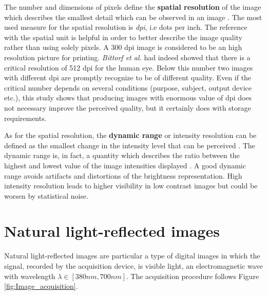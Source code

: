 \documentclass[../main.tex]{subfiles}
\begin{document}
The number and dimensions of pixels define the \textbf{spatial resolution} of the image which describes the smallest detail which can be observed in an image \cite{digital_image_processing_gonzales}.
The most used measure for the spatial resolution is \textit{dpi}, i.e dots per inch. The reference with the spatial unit is helpful in order to better describe the image quality rather than using solely pixels.
A 300 dpi image is considered to be an high resolution picture for printing. \textit{Bittorf et al.} \cite{resolution_requirements} had indeed showed that there is a critical resolution of 512 dpi for the human eye. 
Below this number two images with different dpi are promptly recognize to be of different quality. Even if the critical number depends on several conditions (purpose, subject, output device etc.), this study shows that producing images with enormous value of dpi does not necessary improve the perceived quality, but it certainly does with storage requirements.
 
As for the spatial resolution, the \textbf{dynamic range} or intensity resolution can be defined as the smallest change in the intensity level that can be perceived \cite{digital_image_processing_gonzales}.
The dynamic range is, in fact, a quantity which describes the ratio between the highest and lowest value of the image intensities displayed \cite{dynamic_range}.
A good dynamic range avoids artifacts and distortions of the brightness representation. 
High intensity resolution leads to higher visibility in low contrast images but could be worsen by statistical noise.

\section{Natural light-reflected images}

Natural light-reflected images are particular a type of digital images in which the signal, recorded by the acquisition device, is visible light, an electromagnetic wave with wavelength $\lambda \in [380nm, 700nm]$.
The acquisition procedure follows Figure \ref{fig:Image_acquisition}.
\end{document}
